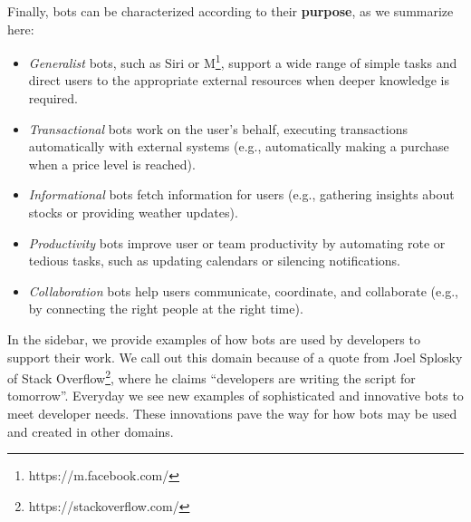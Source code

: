 \documentclass{sig-alternate}
\newcommand{\cl}[1]{\textcolor{blue}{{\it [Carly says: #1]}}}
\begin{document}
Finally, bots can be characterized according to their \textbf{purpose}, as we summarize here: 
\begin{itemize}
\item \emph{Generalist} bots, such as Siri or M\footnote{https://m.facebook.com/}, support a wide range of simple tasks and  direct users to the appropriate external resources when deeper knowledge is required. 
\item \emph{Transactional} bots work on the user's behalf, executing transactions automatically with external systems (e.g., automatically making a purchase when a price level is reached).  
\item \emph{Informational} bots fetch information for users (e.g., gathering insights about stocks or providing weather updates).  
\item \emph{Productivity} bots improve user or team productivity by automating rote or tedious tasks, such as updating calendars or silencing notifications.
\item \emph{Collaboration} bots help users communicate, coordinate, and collaborate (e.g., by connecting the right people at the right time).
\end{itemize}

In the sidebar, we provide examples of how bots are used by developers to support their work. 
We call out this domain because of a quote from Joel Splosky of Stack Overflow\footnote{https://stackoverflow.com/\label{StackOverflow}}, where he claims ``developers are writing the script for tomorrow''. Everyday we see new examples of sophisticated and innovative bots to meet developer needs. These innovations pave the way for how bots may be used and created in other domains.
	
\end{document}

